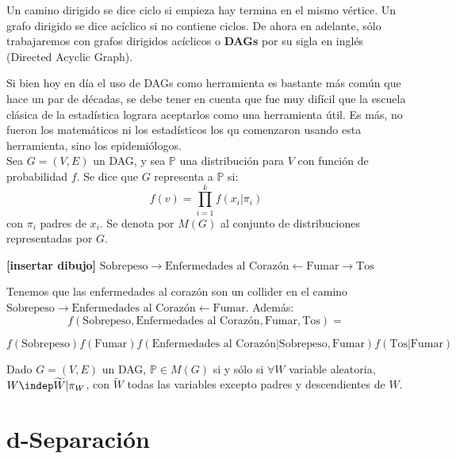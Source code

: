 Un camino dirigido se dice ciclo si empieza hay termina en el mismo vértice. Un grafo dirigido se dice acíclico si no contiene ciclos. De ahora en adelante, sólo trabajaremos con grafos dirigidos acíclicos o \textbf{DAGs} por su sigla en inglés (Directed Acyclic Graph).  

Si bien hoy en día el uso de DAGs como herramienta es bastante más común que hace un par de décadas, se debe tener en cuenta que fue muy difícil que la escuela clásica de la estadística lograra aceptarlos como una herramienta útil. Es más, no fueron los matemáticos ni los estadísticos los qu comenzaron usando esta herramienta, sino los epidemiólogos.  \\

 Sea $G=(V,E)$ un DAG, y sea $\mathbb{P}$ una distribución para $V$ con función de probabilidad $f$. Se dice que $G$ representa a $\mathbb{P}$ si: 
$$
f(v)=\prod_{i=1}^{k} f(x_i|\pi_i) 
$$
con $\pi_i$ padres de $x_i$. Se denota por $M(G)$ al conjunto de distribuciones representadas por $G$. 

\example \textbf{[insertar dibujo]} $\text{Sobrepeso} \rightarrow \text{Enfermedades al Corazón} \leftarrow \text{Fumar} \rightarrow \text{Tos} $

Tenemos que las enfermedades al corazón son un collider en el camino $ \text{Sobrepeso} \rightarrow \text{Enfermedades al Corazón} \leftarrow \text{Fumar}$. Además: 
$$
f(\text{Sobrepeso},\text{Enfermedades al Corazón}, \text{Fumar},\text{Tos})= 
$$

$$
f(\text{Sobrepeso}) f(\text{Fumar}) f(\text{Enfermedades al Corazón}|\text{Sobrepeso},\text{Fumar}) f(\text{Tos}|\text{Fumar}) 
$$

\theorem Dado $G=(V,E)$ un DAG, $\mathbb{P} \in M(G)$ si y sólo si $\forall W $ variable aleatoria, $W \indep \widetilde{W} | \pi_W $, con $\widetilde{W}$ todas las variables excepto padres y descendientes de $W$. 

\section{d-Separación}

